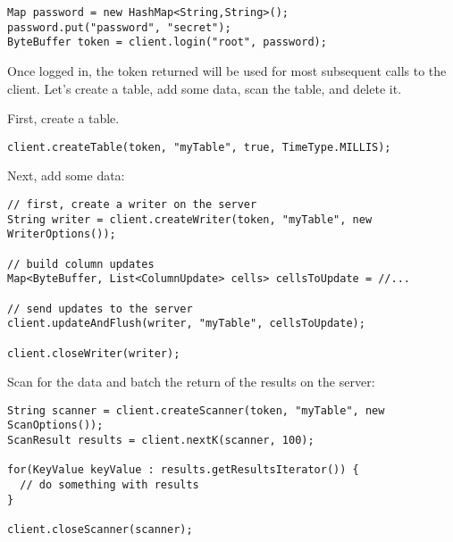 \small
\begin{verbatim}
Map password = new HashMap<String,String>();
password.put("password", "secret");
ByteBuffer token = client.login("root", password);
\end{verbatim}
\normalsize

Once logged in, the token returned will be used for most subsequent calls to the client.
Let's create a table, add some data, scan the table, and delete it.


First, create a table.

\small
\begin{verbatim}
client.createTable(token, "myTable", true, TimeType.MILLIS);
\end{verbatim}
\normalsize


Next, add some data:

\small
\begin{verbatim}
// first, create a writer on the server
String writer = client.createWriter(token, "myTable", new WriterOptions());

// build column updates
Map<ByteBuffer, List<ColumnUpdate> cells> cellsToUpdate = //...

// send updates to the server
client.updateAndFlush(writer, "myTable", cellsToUpdate);

client.closeWriter(writer);
\end{verbatim}
\normalsize


Scan for the data and batch the return of the results on the server:

\small
\begin{verbatim}
String scanner = client.createScanner(token, "myTable", new ScanOptions());
ScanResult results = client.nextK(scanner, 100);

for(KeyValue keyValue : results.getResultsIterator()) {
  // do something with results
}

client.closeScanner(scanner);
\end{verbatim}
\normalsize
